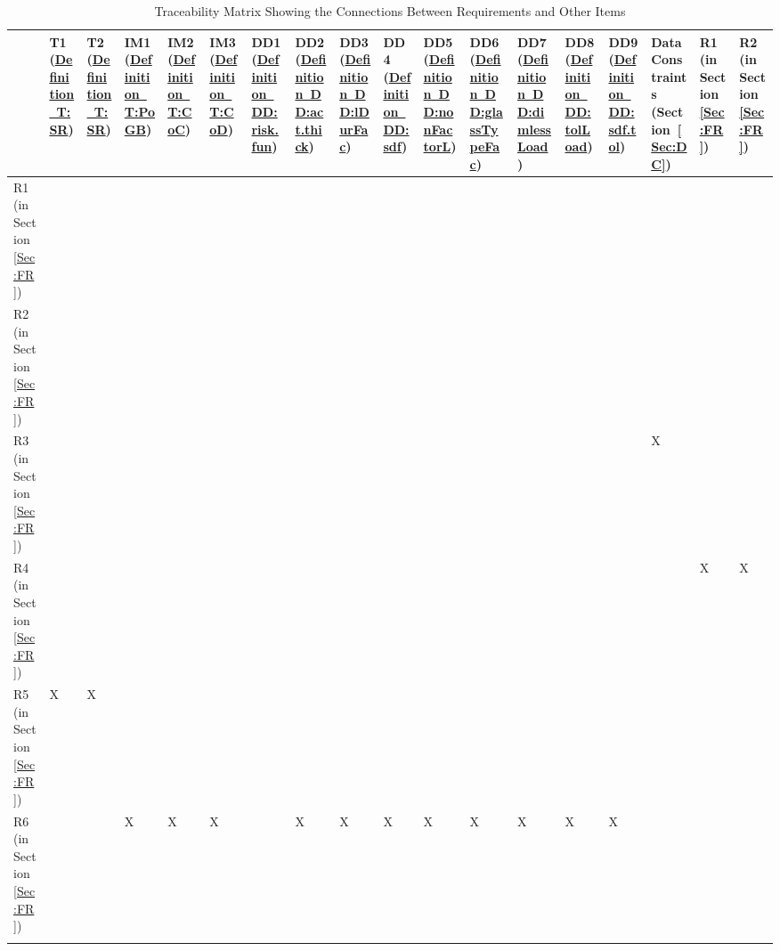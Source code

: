 \documentclass[12pt]{article}
\begin{document}
\begin{longtable}{l l l l l l l l l l l l l l l l l l}
\toprule
 & T1 (\hyperref[T:SR]{Definition~T:SR}) & T2 (\hyperref[T:SR]{Definition~T:SR}) & IM1 (\hyperref[T:PoGB]{Definition~T:PoGB}) & IM2 (\hyperref[T:CoC]{Definition~T:CoC}) & IM3 (\hyperref[T:CoD]{Definition~T:CoD}) & DD1 (\hyperref[DD:risk.fun]{Definition~DD:risk.fun}) & DD2 (\hyperref[DD:act.thick]{Definition~DD:act.thick}) & DD3 (\hyperref[DD:lDurFac]{Definition~DD:lDurFac}) & DD4 (\hyperref[DD:sdf]{Definition~DD:sdf}) & DD5 (\hyperref[DD:nonFactorL]{Definition~DD:nonFactorL}) & DD6 (\hyperref[DD:glassTypeFac]{Definition~DD:glassTypeFac}) & DD7 (\hyperref[DD:dimlessLoad]{Definition~DD:dimlessLoad}) & DD8 (\hyperref[DD:tolLoad]{Definition~DD:tolLoad}) & DD9 (\hyperref[DD:sdf.tol]{Definition~DD:sdf.tol}) & Data Constraints (Section~\ref{Sec:DC}) & R1 (in Section~\ref{Sec:FR}) & R2 (in Section~\ref{Sec:FR})
\\
\midrule
R1 (in Section~\ref{Sec:FR}) &  &  &  &  &  &  &  &  &  &  &  &  &  &  &  &  & 
\\
R2 (in Section~\ref{Sec:FR}) &  &  &  &  &  &  &  &  &  &  &  &  &  &  &  &  & 
\\
R3 (in Section~\ref{Sec:FR}) &  &  &  &  &  &  &  &  &  &  &  &  &  &  & X &  & 
\\
R4 (in Section~\ref{Sec:FR}) &  &  &  &  &  &  &  &  &  &  &  &  &  &  &  & X & X
\\
R5 (in Section~\ref{Sec:FR}) & X & X &  &  &  &  &  &  &  &  &  &  &  &  &  &  & 
\\
R6 (in Section~\ref{Sec:FR}) &  &  & X & X & X &  & X & X & X & X & X & X & X & X &  &  & 
\\
\bottomrule
\caption{Traceability Matrix Showing the Connections Between Requirements and Other Items}
\label{Table:TMStCBRaOI}
\end{longtable}
\end{document}
